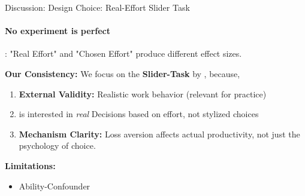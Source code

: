 \documentclass{beamer}
\begin{document}
\begin{frame}{Discussion: Design Choice: Real-Effort Slider Task}
\framesubtitle{No experiment is perfect}

\textcite{BRUGGEN2007}: "Real Effort" and "Chosen Effort" produce different effect sizes.

\vspace{0.3cm}

\textbf{Our Consistency:}
We focus on the \textbf{Slider-Task} by \textcite{GILL2019}, because,

\begin{enumerate}
  \item \textbf{External Validity:} Realistic work behavior 
        (relevant for practice)
  \item \textcite{Herweg2010} is interested in \emph{real} Decisions based on effort, not stylized choices
  \item \textbf{Mechanism Clarity:} Loss aversion affects actual 
        productivity, not just the psychology of choice.
\end{enumerate}

\vspace{0.3cm}

\textbf{Limitations:}
\begin{itemize}
  \item Ability-Confounder
\end{itemize}

\end{frame}
\end{document}
